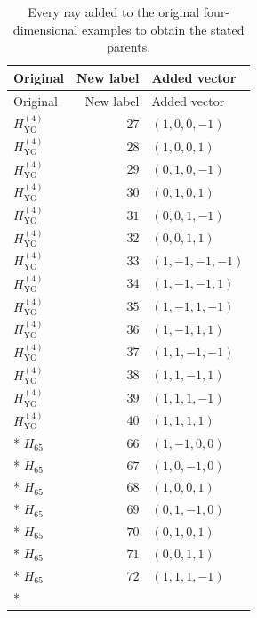 \documentclass[aps,pra,reprint,superscriptaddress,longbibliography,nofootinbib,floatfix,10pt]{revtex4-2}
\theoremstyle{definition}
\newcommand{\YO}{\mathrm{YO}}
\begin{document}
\endgroup
\begingroup\small
{}
\begin{longtable}{lrl}
\caption{Every ray added to the original four-dimensional examples to obtain the stated parents.}\label{tab:parent-added-rays}\\
\toprule
Original & New label & Added vector\\\midrule
\endfirsthead
\toprule
Original & New label & Added vector\\\midrule
\endhead
\bottomrule\endfoot
$H_{\YO}^{(4)}$ & $27$ & $(1,0,0,-1)$\\
$H_{\YO}^{(4)}$ & $28$ & $(1,0,0,1)$\\
$H_{\YO}^{(4)}$ & $29$ & $(0,1,0,-1)$\\
$H_{\YO}^{(4)}$ & $30$ & $(0,1,0,1)$\\
$H_{\YO}^{(4)}$ & $31$ & $(0,0,1,-1)$\\
$H_{\YO}^{(4)}$ & $32$ & $(0,0,1,1)$\\
$H_{\YO}^{(4)}$ & $33$ & $(1,-1,-1,-1)$\\
$H_{\YO}^{(4)}$ & $34$ & $(1,-1,-1,1)$\\
$H_{\YO}^{(4)}$ & $35$ & $(1,-1,1,-1)$\\
$H_{\YO}^{(4)}$ & $36$ & $(1,-1,1,1)$\\
$H_{\YO}^{(4)}$ & $37$ & $(1,1,-1,-1)$\\
$H_{\YO}^{(4)}$ & $38$ & $(1,1,-1,1)$\\
$H_{\YO}^{(4)}$ & $39$ & $(1,1,1,-1)$\\
$H_{\YO}^{(4)}$ & $40$ & $(1,1,1,1)$\\*
$H_{65}$ & $66$ & $(1,-1,0,0)$\\*
$H_{65}$ & $67$ & $(1,0,-1,0)$\\*
$H_{65}$ & $68$ & $(1,0,0,1)$\\*
$H_{65}$ & $69$ & $(0,1,-1,0)$\\*
$H_{65}$ & $70$ & $(0,1,0,1)$\\*
$H_{65}$ & $71$ & $(0,0,1,1)$\\*
$H_{65}$ & $72$ & $(1,1,1,-1)$\\*
\end{longtable}
\endgroup
\begingroup\small
{}
\end{document}
